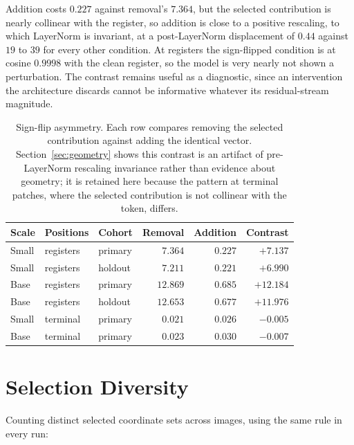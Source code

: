 \documentclass{article}
\begin{document}
Addition costs $0.227$ against removal's $7.364$, but the selected contribution is nearly collinear with the register, so addition is close to a positive rescaling, to which LayerNorm is invariant, at a post-LayerNorm displacement of $0.44$ against $19$ to $39$ for every other condition. At registers the sign-flipped condition is at cosine $0.9998$ with the clean register, so the model is very nearly not shown a perturbation. The contrast remains useful as a diagnostic, since an intervention the architecture discards cannot be informative whatever its residual-stream magnitude.

\begin{table}[h]
\centering
\caption{Sign-flip asymmetry. Each row compares removing the selected contribution against adding the identical vector. Section~\ref{sec:geometry} shows this contrast is an artifact of pre-LayerNorm rescaling invariance rather than evidence about geometry; it is retained here because the pattern at terminal patches, where the selected contribution is not collinear with the token, differs.}
\label{tab:signflip}
\begin{tabular}{lllrrr}
\toprule
Scale & Positions & Cohort & Removal & Addition & Contrast \\
\midrule
Small & registers & primary & $7.364$  & $0.227$  & $+7.137$  \\
Small & registers & holdout & $7.211$  & $0.221$  & $+6.990$  \\
Base  & registers & primary & $12.869$ & $0.685$  & $+12.184$ \\
Base  & registers & holdout & $12.653$ & $0.677$  & $+11.976$ \\
Small & terminal  & primary & $0.021$  & $0.026$  & $-0.005$  \\
Base  & terminal  & primary & $0.023$  & $0.030$  & $-0.007$  \\
\bottomrule
\end{tabular}
\end{table}

\section{Selection Diversity}
\label{app:selection}

Counting distinct selected coordinate sets across images, using the same rule in every run:
\end{document}
